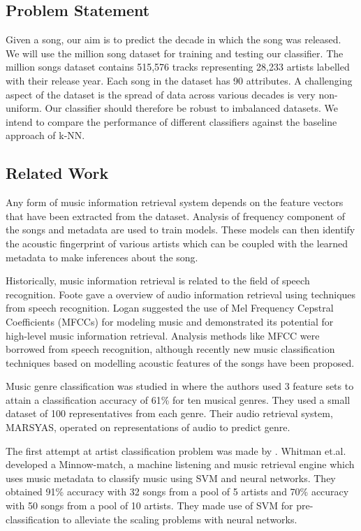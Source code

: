 \documentclass[twocolumn]{article}
\begin{document}
\subsection{Problem Statement}
Given a song, our aim is to predict the decade in which the song was released. We will use the million song dataset for training and testing our classifier. The million songs dataset contains 515,576 tracks representing 28,233 artists labelled with their release year. Each song in the dataset has 90 attributes. A challenging aspect of the dataset is the spread of data across various decades is very non-uniform. Our classifier should therefore be robust to imbalanced datasets.
We intend to compare the performance of different classifiers against the baseline approach of k-NN.
\subsection{Related Work}

Any form of music information retrieval system depends on the feature vectors that have been extracted from the dataset. Analysis of frequency component of the songs and metadata are used to train models. These models can then identify the acoustic fingerprint of various artists which can be coupled with the learned metadata to make inferences about the song.

Historically, music information retrieval is related to the field of speech recognition. Foote \cite{Foote} gave a overview of audio information retrieval using techniques from speech recognition. Logan \cite{LOGAN} suggested the use of Mel Frequency Cepstral Coefficients (MFCCs) for modeling music and demonstrated its potential for high-level music information retrieval. Analysis methods like MFCC were borrowed from speech recognition, although recently new music classification techniques based on modelling acoustic features of the songs have been proposed.

Music genre classification was studied in \cite{GTAN} where the authors used 3 feature sets to attain a classification accuracy of 61\% for ten musical genres. They used a small dataset of 100 representatives from each genre. Their audio retrieval system, MARSYAS, operated on representations of audio to predict genre.

The first attempt at artist classification problem was made by \cite{BGS}. Whitman et.al.\cite{BGS} developed a Minnow-match, a machine listening and music retrieval engine which uses music metadata to classify music using SVM and neural networks. They obtained 91\% accuracy with 32 songs from a pool of 5 artists and 70\% accuracy with 50 songs from a pool of 10 artists. They made use of SVM for pre-classification to alleviate the scaling problems with neural networks.
\end{document}

